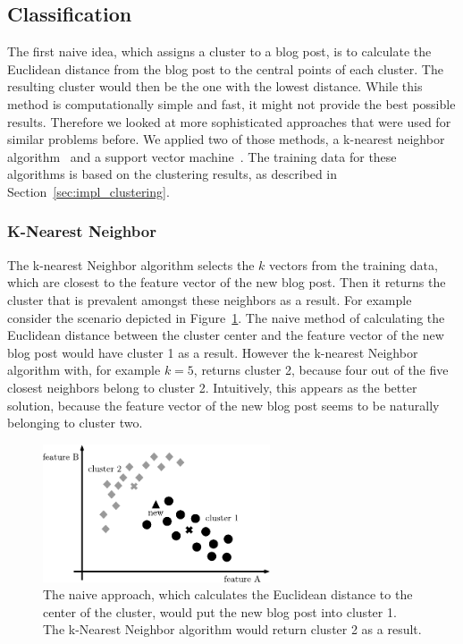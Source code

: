 \subsection{Classification}
\label{sec:impl_classification}


The first naive idea, which assigns a cluster to a blog post, is to calculate the Euclidean distance from the blog post to the central points of each cluster.
The resulting cluster would then be the one with the lowest distance.
While this method is computationally simple and fast, it might not provide the best possible results.
Therefore we looked at more sophisticated approaches that were used for similar problems before.
We applied two of those methods, a k-nearest neighbor algorithm~\cite{peterson2009k} and a support vector machine~\cite{kolari2006svms}.
The training data for these algorithms is based on the clustering results, as described in Section~\ref{sec:impl_clustering}.


\subsubsection{K-Nearest Neighbor}
\label{sec:k_nearest_neighbor}


The k-nearest Neighbor algorithm selects the $k$ vectors from the training data, which are closest to the feature vector of the new blog post.
Then it returns the cluster that is prevalent amongst these neighbors as a result.
For example consider the scenario depicted in Figure~\ref{fig:naive}.
The naive method of calculating the Euclidean distance between the cluster center and the feature vector of the new blog post would have cluster 1 as a result.
However the k-nearest Neighbor algorithm with, for example $k=5$, returns cluster 2, because four out of the five closest neighbors belong to cluster 2.
Intuitively, this appears as the better solution, because the feature vector of the new blog post seems to be naturally belonging to cluster two.


\begin{figure}[ht!]
    \centering
    \includegraphics[width=0.6\textwidth]{images/naive.pdf}
    \caption{The naive approach, which calculates the Euclidean distance to the center of the cluster, would put the new blog post into cluster 1. The k-Nearest Neighbor algorithm would return cluster 2 as a result.}
    \label{fig:naive}
\end{figure}


